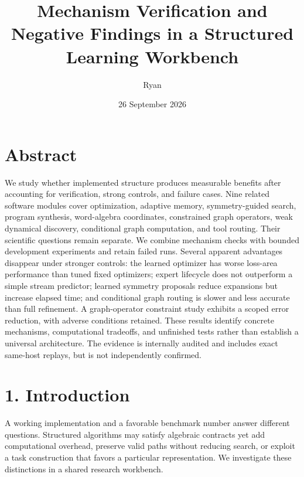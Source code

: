 \documentclass[
  11pt,
  a4paper,
]{article}
\title{Mechanism Verification and Negative Findings in a Structured
Learning Workbench}
\author{Ryan}
\date{26 September 2026}
\begin{document}
\maketitle

\section{Abstract}\label{abstract}

We study whether implemented structure produces measurable benefits
after accounting for verification, strong controls, and failure cases.
Nine related software modules cover optimization, adaptive memory,
symmetry-guided search, program synthesis, word-algebra coordinates,
constrained graph operators, weak dynamical discovery, conditional graph
computation, and tool routing. Their scientific questions remain
separate. We combine mechanism checks with bounded development
experiments and retain failed runs. Several apparent advantages
disappear under stronger controls: the learned optimizer has worse
loss-area performance than tuned fixed optimizers; expert lifecycle does
not outperform a simple stream predictor; learned symmetry proposals
reduce expansions but increase elapsed time; and conditional graph
routing is slower and less accurate than full refinement. A
graph-operator constraint study exhibits a scoped error reduction, with
adverse conditions retained. These results identify concrete mechanisms,
computational tradeoffs, and unfinished tests rather than establish a
universal architecture. The evidence is internally audited and includes
exact same-host replays, but is not independently confirmed.

\section{1. Introduction}\label{introduction}

A working implementation and a favorable benchmark number answer
different questions. Structured algorithms may satisfy algebraic
contracts yet add computational overhead, preserve valid paths without
reducing search, or exploit a task construction that favors a particular
representation. We investigate these distinctions in a shared research
workbench.
\end{document}
